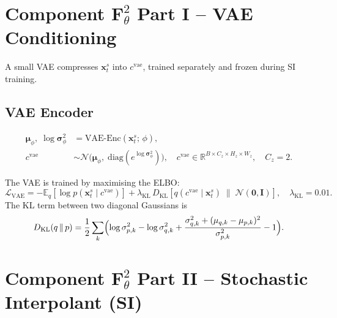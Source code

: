 \documentclass[11pt]{article}
\begin{document}
\section{Component $\mathbf{F}^2_\theta$ Part I -- VAE Conditioning}
\label{sec:vae}

A small VAE compresses $\mathbf{x}_t^s$ into $c^{\mathrm{vae}}$, trained
separately and frozen during SI training.

\subsection{VAE Encoder}

\begin{align}
  \bm{\mu}_\phi,\;\log\bm{\sigma}^2_\phi
    &= \mathrm{VAE\text{-}Enc}\!\left(\mathbf{x}_t^s;\,\phi\right),\\
  c^{\mathrm{vae}}
    &\sim \mathcal{N}\!\bigl(\bm{\mu}_\phi,\;
       \mathrm{diag}(e^{\log\bm{\sigma}^2_\phi})\bigr),
    \quad c^{\mathrm{vae}} \in \mathbb{R}^{B \times C_z \times H_z \times W_z},
    \quad C_z = 2.
\end{align}

The VAE is trained by maximising the ELBO:
\begin{equation}
  \mathcal{L}_{\mathrm{VAE}}
  = -\mathbb{E}_{q}\!\left[\log p\!\left(\mathbf{x}_t^s \mid c^{\mathrm{vae}}\right)\right]
  + \lambda_{\mathrm{KL}}\,
    D_{\mathrm{KL}}\!\left[
      q\!\left(c^{\mathrm{vae}}\mid\mathbf{x}_t^s\right)
      \;\|\;\mathcal{N}(\mathbf{0},\mathbf{I})
    \right],
  \quad \lambda_{\mathrm{KL}} = 0.01.
\end{equation}
The KL term between two diagonal Gaussians is
\begin{equation}
  D_{\mathrm{KL}}(q\,\|\,p)
  = \frac{1}{2}\sum_k
    \Bigl(
      \log\sigma^2_{p,k} - \log\sigma^2_{q,k}
      + \frac{\sigma^2_{q,k} + (\mu_{q,k}-\mu_{p,k})^2}{\sigma^2_{p,k}}
      - 1
    \Bigr).
\end{equation}

\section{Component $\mathbf{F}^2_\theta$ Part II -- Stochastic Interpolant (SI)}
\end{document}
